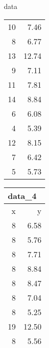 \documentclass[
  ignorenonframetext,
]{beamer}
\providecommand{\tightlist}{%
  \setlength{\itemsep}{0pt}\setlength{\parskip}{0pt}}
\begin{document}
\begin{frame}{data}
\begin{tabular}{rr}
\midrule
10 & 7.46\\
8 & 6.77\\
13 & 12.74\\
9 & 7.11\\
11 & 7.81\\
14 & 8.84\\
6 & 6.08\\
4 & 5.39\\
12 & 8.15\\
7 & 6.42\\
5 & 5.73\\
\bottomrule
\end{tabular}\hfill
\begin{tabular}{rr}
\multicolumn{2}{l}{data\_4}\\
\toprule
x & y\\
\midrule
8 & 6.58\\
8 & 5.76\\
8 & 7.71\\
8 & 8.84\\
8 & 8.47\\
8 & 7.04\\
8 & 5.25\\
19 & 12.50\\
8 & 5.56\\
8 & 7.91\\
8 & 6.89\\
\bottomrule
\end{tabular}
\end{frame}

\begin{frame}{data}
\protect\hypertarget{data-2}{}
それぞれどういうデータなんだろう

\begin{itemize}[<+->]
\tightlist
\item
  表だけ見てもよくわからない
\end{itemize}
\end{frame}

\begin{frame}{data}
\protect\hypertarget{data-3}{}
それぞれどういうデータなんだろう

\begin{itemize}[<+->]
\tightlist
\item
  xの平均
\item
  xの分散
\item
  yの平均
\item
  yの分散
\item
  xとyの相関係数
\item
  回帰直線の式
\end{itemize}
\end{frame}
\end{document}
